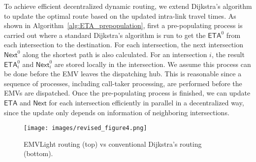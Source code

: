 To achieve efficient decentralized dynamic routing, we extend Dijkstra's algorithm to update the optimal route based on the updated intra-link travel times. As shown in Algorithm~\ref{alg:ETA_prepopulation}, first a pre-populating process is carried out where a standard Dijkstra's algorithm is run to get the $\mathsf{ETA}^0$ from each intersection to the destination. For each intersection, the next intersection $\mathsf{Next}^0$ along the shortest path is also calculated. For an intersection $i$, the result $\mathsf{ETA}_i^0$ and $\mathsf{Next}_i^0$ are stored locally in the intersection. We assume this process can be done before the EMV leaves the dispatching hub. This is reasonable since a sequence of processes, including call-taker processing, are performed before the EMVs are dispatched. Once the pre-populating process is finished, we can update $\mathsf{ETA}$ and $\mathsf{Next}$ for each intersection efficiently in parallel in a decentralized way, since the update only depends on information of neighboring intersections. 
\begin{figure}[h]
\texttt{[image: images/revised\_figure4.png]}
\centering
\caption{EMVLight routing (top) vs conventional Dijkstra's routing (bottom).}
\label{fig_EMVLight_routing}
\end{figure}
